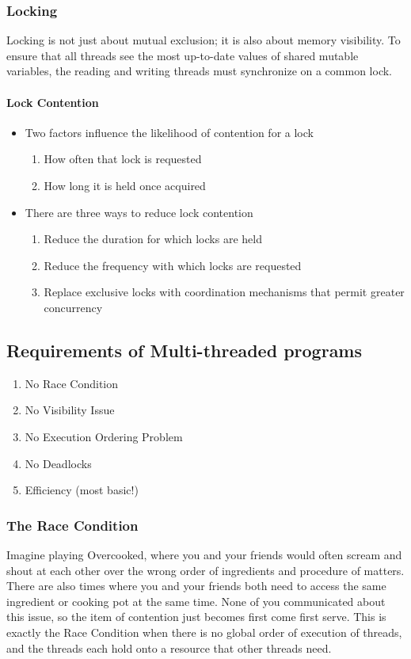 \documentclass[a4paper]{article}
\begin{document}
\subsubsection{Locking}
Locking is not just about mutual exclusion; it is also about memory visibility. To ensure that all threads see the most up-to-date values of shared mutable variables, the reading and writing threads must synchronize on a common lock.
\paragraph{Lock Contention}
\begin{itemize}
	\item Two factors influence the likelihood of contention for a lock
	\begin{enumerate}[label=\roman*.]
		\item How often that lock is requested
		\item How long it is held once acquired
	\end{enumerate}
	
	\item There are three ways to reduce lock contention
	\begin{enumerate}[label=\roman*.]
		\item Reduce the duration for which locks are held
		\item Reduce the frequency with which locks are requested
		\item Replace exclusive locks with coordination mechanisms that permit greater concurrency
	\end{enumerate}
\end{itemize}
\subsection{Requirements of Multi-threaded programs}
\begin{enumerate}
	\item No Race Condition
	\item No Visibility Issue
	\item No Execution Ordering Problem
	\item No Deadlocks
	\item Efficiency (most basic!)
\end{enumerate}
\subsubsection{The Race Condition}
Imagine playing Overcooked, where you and your friends would often scream and shout at each other over the wrong order of ingredients and procedure of matters. There are also times where you and your friends both need to access the same ingredient or cooking pot at the same time. None of you communicated about this issue, so the item of contention just becomes first come first serve. This is exactly the Race Condition when there is no global order of execution of threads, and the threads each hold onto a resource that other threads need.
\end{document}
